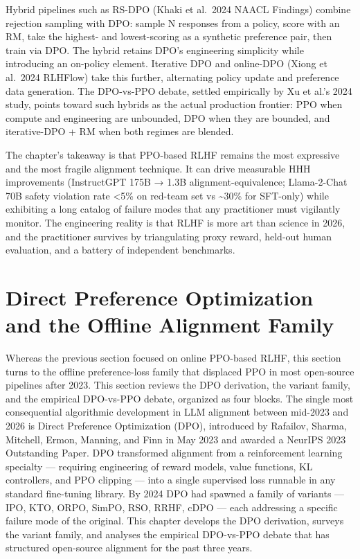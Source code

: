 \documentclass{article}
\begin{document}
Hybrid pipelines such as RS-DPO (Khaki et al.~2024 NAACL Findings) combine rejection sampling with DPO: sample N responses from a policy, score with an RM, take the highest- and lowest-scoring as a synthetic preference pair, then train via DPO. The hybrid retains DPO's engineering simplicity while introducing an on-policy element. Iterative DPO and online-DPO (Xiong et al.~2024 RLHFlow) take this further, alternating policy update and preference data generation. The DPO-vs-PPO debate, settled empirically by Xu et al.'s 2024 study, points toward such hybrids as the actual production frontier: PPO when compute and engineering are unbounded, DPO when they are bounded, and iterative-DPO + RM when both regimes are blended.

The chapter's takeaway is that PPO-based RLHF remains the most expressive and the most fragile alignment technique. It can drive measurable HHH improvements (InstructGPT 175B → 1.3B alignment-equivalence; Llama-2-Chat 70B safety violation rate \textless5\% on red-team set vs \textasciitilde30\% for SFT-only) while exhibiting a long catalog of failure modes that any practitioner must vigilantly monitor. The engineering reality is that RLHF is more art than science in 2026, and the practitioner survives by triangulating proxy reward, held-out human evaluation, and a battery of independent benchmarks.

\section{Direct Preference Optimization and the Offline Alignment Family}\label{direct-preference-optimization-and-the-offline-alignment-family}

Whereas the previous section focused on online PPO-based RLHF, this section turns to the offline preference-loss family that displaced PPO in most open-source pipelines after 2023. This section reviews the DPO derivation, the variant family, and the empirical DPO-vs-PPO debate, organized as four blocks. The single most consequential algorithmic development in LLM alignment between mid-2023 and 2026 is Direct Preference Optimization (DPO), introduced by Rafailov, Sharma, Mitchell, Ermon, Manning, and Finn in May 2023 and awarded a NeurIPS 2023 Outstanding Paper. DPO transformed alignment from a reinforcement learning specialty --- requiring engineering of reward models, value functions, KL controllers, and PPO clipping --- into a single supervised loss runnable in any standard fine-tuning library. By 2024 DPO had spawned a family of variants --- IPO, KTO, ORPO, SimPO, RSO, RRHF, cDPO --- each addressing a specific failure mode of the original. This chapter develops the DPO derivation, surveys the variant family, and analyses the empirical DPO-vs-PPO debate that has structured open-source alignment for the past three years.
\end{document}
